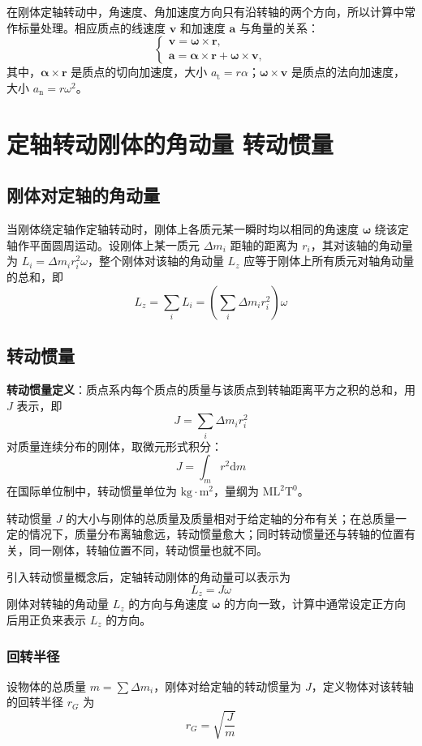     在刚体定轴转动中，角速度、角加速度方向只有沿转轴的两个方向，所以计算中常作标量处理。相应质点的线速度 $\boldsymbol{v}$ 和加速度 $\boldsymbol{a}$ 与角量的关系：
    \[
    \begin{cases}
    \boldsymbol{v}=\boldsymbol{\omega}\times\boldsymbol{r},\\
    \boldsymbol{a}=\boldsymbol{\alpha}\times\boldsymbol{r}+\boldsymbol{\omega}\times\boldsymbol{v},
    \end{cases}
    \]
    其中，$\boldsymbol{\alpha}\times\boldsymbol{r}$ 是质点的切向加速度，大小 $a_\mathrm{t}=r\alpha$；$\boldsymbol{\omega}\times\boldsymbol{v}$ 是质点的法向加速度，大小 $a_\mathrm{n}=r\omega^2$。

\section{定轴转动刚体的角动量 转动惯量}
    \subsection{刚体对定轴的角动量}
    当刚体绕定轴作定轴转动时，刚体上各质元某一瞬时均以相同的角速度 $\boldsymbol{\omega}$ 绕该定轴作平面圆周运动。设刚体上某一质元 $\Delta m_i$ 距轴的距离为 $r_i$，其对该轴的角动量为 $L_i=\Delta m_i r_i^2 \omega$，整个刚体对该轴的角动量 $L_z$ 应等于刚体上所有质元对轴角动量的总和，即
    \[
    L_z = \sum_{i} L_i = \left(\sum_{i} \Delta m_i r_i^2\right)\omega
    \]

    \subsection{转动惯量}
    \textbf{转动惯量定义}：质点系内每个质点的质量与该质点到转轴距离平方之积的总和，用 $J$ 表示，即
    \[
    J = \sum_{i} \Delta m_i r_i^2
    \]
    对质量连续分布的刚体，取微元形式积分：
    \[
    J = \int_{m} r^2 \mathrm{d}m
    \]
    在国际单位制中，转动惯量单位为 $\mathrm{kg\cdot m^2}$，量纲为 $\mathrm{ML^2T^0}$。

    转动惯量 $J$ 的大小与刚体的总质量及质量相对于给定轴的分布有关；在总质量一定的情况下，质量分布离轴愈远，转动惯量愈大；同时转动惯量还与转轴的位置有关，同一刚体，转轴位置不同，转动惯量也就不同。

    引入转动惯量概念后，定轴转动刚体的角动量可以表示为
    \[
    L_z = J \omega
    \]
    刚体对转轴的角动量 $L_z$ 的方向与角速度 $\boldsymbol{\omega}$ 的方向一致，计算中通常设定正方向后用正负来表示 $L_z$ 的方向。

    \subsubsection{回转半径}
    设物体的总质量 $m=\sum \Delta m_i$，刚体对给定轴的转动惯量为 $J$，定义物体对该转轴的回转半径 $r_G$ 为
    \[
    r_G=\sqrt{\frac{J}{m}}
    \]

